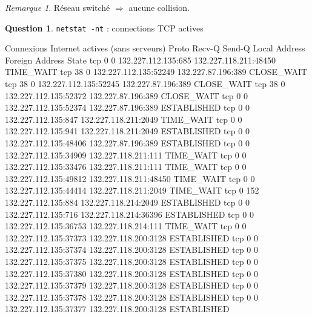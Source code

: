 \documentclass[11pt,english,french]{scrreprt}
\theoremstyle{remark}
\newtheorem*{rem*}{Remarque}
\theoremstyle{definition}
\newtheorem{ques*}{Question}[subsection]
\begin{document}
\begin{rem*}
	Réseau switché $\Rightarrow$ aucune collision.
\end{rem*}

\begin{ques*}
	\lstinline!netstat -nt! : connections TCP actives
\end{ques*}


\begin{verbatimtab}
Connexions Internet actives (sans serveurs)
Proto Recv-Q Send-Q Local Address               Foreign Address             State      
tcp        0      0 132.227.112.135:685         132.227.118.211:48450       TIME_WAIT   
tcp       38      0 132.227.112.135:52249       132.227.87.196:389          CLOSE_WAIT  
tcp       38      0 132.227.112.135:52245       132.227.87.196:389          CLOSE_WAIT  
tcp       38      0 132.227.112.135:52372       132.227.87.196:389          CLOSE_WAIT  
tcp        0      0 132.227.112.135:52374       132.227.87.196:389          ESTABLISHED 
tcp        0      0 132.227.112.135:847         132.227.118.211:2049        TIME_WAIT   
tcp        0      0 132.227.112.135:941         132.227.118.211:2049        ESTABLISHED 
tcp        0      0 132.227.112.135:48406       132.227.87.196:389          ESTABLISHED 
tcp        0      0 132.227.112.135:34909       132.227.118.211:111         TIME_WAIT   
tcp        0      0 132.227.112.135:33476       132.227.118.211:111         TIME_WAIT   
tcp        0      0 132.227.112.135:49812       132.227.118.211:48450       TIME_WAIT   
tcp        0      0 132.227.112.135:44414       132.227.118.211:2049        TIME_WAIT   
tcp        0    152 132.227.112.135:884         132.227.118.214:2049        ESTABLISHED 
tcp        0      0 132.227.112.135:716         132.227.118.214:36396       ESTABLISHED 
tcp        0      0 132.227.112.135:36753       132.227.118.214:111         TIME_WAIT   
tcp        0      0 132.227.112.135:37373       132.227.118.200:3128        ESTABLISHED 
tcp        0      0 132.227.112.135:37374       132.227.118.200:3128        ESTABLISHED 
tcp        0      0 132.227.112.135:37375       132.227.118.200:3128        ESTABLISHED 
tcp        0      0 132.227.112.135:37380       132.227.118.200:3128        ESTABLISHED 
tcp        0      0 132.227.112.135:37379       132.227.118.200:3128        ESTABLISHED 
tcp        0      0 132.227.112.135:37378       132.227.118.200:3128        ESTABLISHED 
tcp        0      0 132.227.112.135:37377       132.227.118.200:3128        ESTABLISHED 
\end{verbatimtab}
\end{document}
